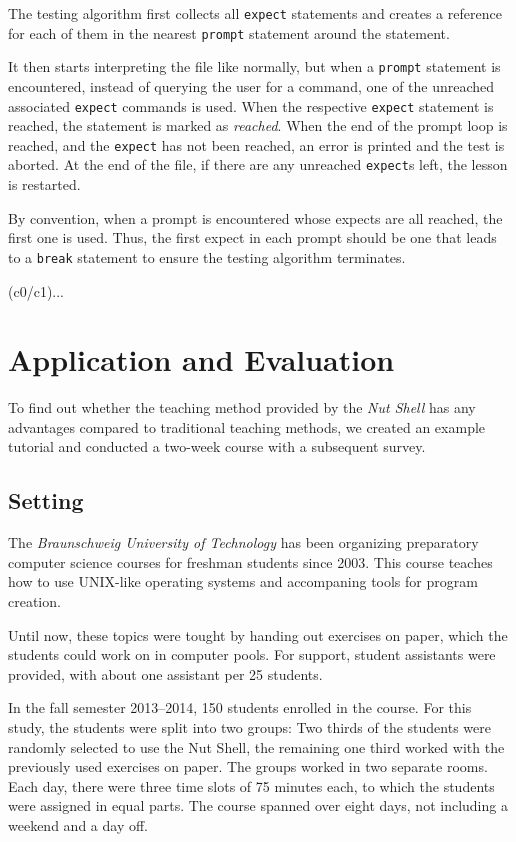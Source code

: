 \documentclass[paper=a4,twoside,abstract=on,cleardoublepage=empty,numbers=noenddot,toc=bib,12pt,appendixprefix=true]{scrreprt}
\begin{document}
The testing algorithm first collects all \texttt{expect} statements and creates a reference for each of them in the nearest \texttt{prompt} statement around the statement.

It then starts interpreting the file like normally, but when a \texttt{prompt} statement is encountered, instead of querying the user for a command, one of the unreached associated \texttt{expect} commands is used. When the respective \texttt{expect} statement is reached, the statement is marked as \emph{reached}. When the end of the prompt loop is reached, and the \texttt{expect} has not been reached, an error is printed and the test is aborted. At the end of the file, if there are any unreached \texttt{expect}s left, the lesson is restarted.

By convention, when a prompt is encountered whose expects are all reached, the first one is used. Thus, the first expect in each prompt should be one that leads to a \texttt{break} statement to ensure the testing algorithm terminates.

(c0/c1)...

\chapter{Application and Evaluation}
\label{sec:evaluation}

To find out whether the teaching method provided by the \emph{Nut Shell} has any advantages compared to traditional teaching methods, we created an example tutorial and conducted a two-week course with a subsequent survey.

\section{Setting}

The \textit{Braunschweig University of Technology} has been organizing preparatory computer science courses for freshman students since 2003. This course teaches how to use UNIX-like operating systems and accompaning tools for program creation.

Until now, these topics were tought by handing out exercises on paper, which the students could work on in computer pools. For support, student assistants were provided, with about one assistant per 25 students.

In the fall semester 2013--2014, 150 students enrolled in the course. For this study, the students were split into two groups: Two thirds of the students were randomly selected to use the Nut Shell, the remaining one third worked with the previously used exercises on paper. The groups worked in two separate rooms. Each day, there were three time slots of 75 minutes each, to which the students were assigned in equal parts. The course spanned over eight days, not including a weekend and a day off.
\end{document}
